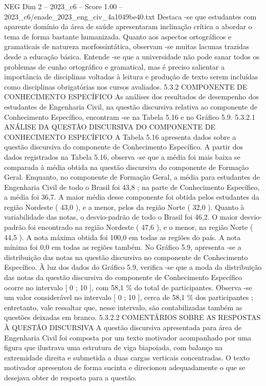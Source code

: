 \begin{textsample}{NEG Dim 2 – 2023\_c6 – Score 1.00 – 2023\_c6/enade\_2023\_eng\_civ\_4a1049be40.txt}
Destaca -se que estudantes com aparente domínio da área de saúde apresentaram inclinação crítica a abordar o tema de forma bastante humanizada.
Quanto aos aspectos ortográficos e gramaticais de natureza morfossintática, observam -se muitas lacunas trazidas desde a educação básica.
Entende -se que a universidade não pode sanar todos os problemas de cunho ortográfico e gramatical, mas é preciso salientar a importância de disciplinas voltadas à leitura e produção de texto serem incluídas como disciplinas obrigatórias nos cursos avaliados. 5.3.2 COMPONENTE DE CONHECIMENTO ESPECÍFICO As análises dos resultados de desempenho dos estudantes de Engenharia Civil, na questão discursiva relativa ao componente de Conhecimento Específico, encontram -se na Tabela 5.16 e no Gráfico 5.9. 5.3.2.1 ANÁLISE DA QUESTÃO DISCURSIVA DO COMPONENTE DE CONHECIMENTO ESPECÍFICO A Tabela 5.16 apresenta dados sobre a questão discursiva do componente de Conhecimento Específico.
A partir dos dados registrados na Tabela 5.16, observa -se que a média foi mais baixa se comparada à média obtida na questão discursiva do componente de Formação Geral.
Enquanto, no componente de Formação Geral, a média para estudantes de Engenharia Civil de todo o Brasil foi 43,8 ; na parte de Conhecimento Específico, a média foi 36,7.
A maior média desse componente foi obtida pelos estudantes da região Nordeste ( 43,0 ), e a menor, pelos da região Norte ( 32,0 ).
Quanto à variabilidade das notas, o desvio-padrão de todo o Brasil foi 46,2.
O maior desvio-padrão foi encontrado na região Nordeste ( 47,6 ), e o menor, na região Norte ( 44,5 ).
A nota máxima obtida foi 100,0 em todas as regiões do país.
A nota mínima foi 0,0 em todas as regiões também.
No Gráfico 5.9, apresenta -se a distribuição das notas na questão discursiva no componente de Conhecimento Específico.
À luz dos dados do Gráfico 5.9, verifica -se que a moda da distribuição das notas da questão discursiva do componente de Conhecimento Específico ocorre no intervalo [ 0 ; 10 ], com 58,1 \% do total de participantes.
Observa -se um valor considerável no intervalo [ 0 ; 10 ], cerca de 58,1 \% dos participantes ; entretanto, vale ressaltar que, nesse intervalo, são contabilizadas também as questões deixadas em branco. 5.3.2.2 COMENTÁRIOS SOBRE AS RESPOSTAS À QUESTÃO DISCURSIVA A questão discursiva apresentada para área de Engenharia Civil foi composta por um texto motivador acompanhado por uma figura que ilustrava uma estrutura de viga biapoiada, com balanço na extremidade direita e submetida a duas cargas verticais concentradas.
O texto motivador apresentou de forma sucinta e direcionou adequadamente o que se desejava obter de resposta para a questão.

\end{textsample}
